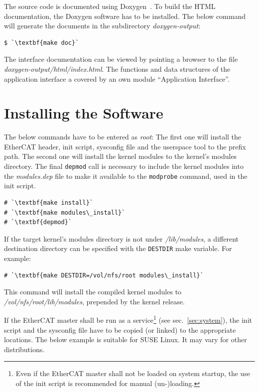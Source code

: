 \documentclass[a4paper,12pt,BCOR6mm,bibtotoc,idxtotoc]{scrbook}
\begin{document}
The source code is documented using Doxygen~\cite{doxygen}. To build the HTML
documentation, the Doxygen software has to be installed. The below command
will generate the documents in the subdirectory \textit{doxygen-output}:

\begin{lstlisting}
$ `\textbf{make doc}`
\end{lstlisting}

The interface documentation can be viewed by pointing a browser to the file
\textit{doxygen-output/html/index.html}. The functions and data structures of
the application interface a covered by an own module ``Application
Interface''.

\section{Installing the Software}

The below commands have to be entered as \textit{root}: The first one will
install the EtherCAT header, init script, sysconfig file and the userspace
tool to the prefix path. The second one will install the kernel modules to the
kernel's modules directory. The final \lstinline+depmod+ call is necessary to
include the kernel modules into the \textit{modules.dep} file to make it
available to the \lstinline+modprobe+ command, used in the init script.

\begin{lstlisting}
# `\textbf{make install}`
# `\textbf{make modules\_install}`
# `\textbf{depmod}`
\end{lstlisting}

If the target kernel's modules directory is not under \textit{/lib/modules}, a
different destination directory can be specified with the \lstinline+DESTDIR+
make variable. For example:

\begin{lstlisting}
# `\textbf{make DESTDIR=/vol/nfs/root modules\_install}`
\end{lstlisting}

This command will install the compiled kernel modules to
\textit{/vol/nfs/root/lib/modules}, prepended by the kernel release.

If the EtherCAT master shall be run as a service\footnote{Even if the EtherCAT
master shall not be loaded on system startup, the use of the init script is
recommended for manual (un-)loading.} (see sec.~\ref{sec:system}), the init
script and the sysconfig file have to be copied (or linked) to the appropriate
locations. The below example is suitable for SUSE Linux. It may vary for other
distributions.
\end{document}
